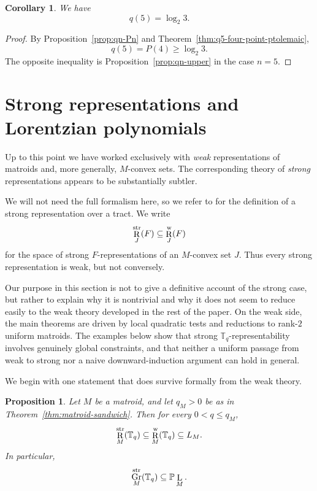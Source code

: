\documentclass[12pt]{amsart}
\newtheorem{proposition}[theorem]{Proposition}
\newtheorem{corollary}[theorem]{Corollary}
\theoremstyle{definition}
\newcommand{\1}{\mathbf{1}}
\DeclareMathOperator{\upL}{L}   %
\DeclareMathOperator{\upR}{R}   %
\DeclareMathOperator{\Gr}{Gr}
\renewcommand\P{{\mathbb P}}
\newcommand\T{{\mathbb T}}
\begin{document}
\begin{corollary}
\label{cor:q5-sharp}
We have
\[
        q(5)=\log_2 3.
\]
\end{corollary}

\begin{proof}
By Proposition~\ref{prop:qn-Pn} and Theorem~\ref{thm:q5-four-point-ptolemaic},
\[
        q(5)=P(4)\ge \log_2 3.
\]
The opposite inequality is Proposition~\ref{prop:qn-upper} in the case $n=5$.
\end{proof}


\section{Strong representations and Lorentzian polynomials}
\label{sec:strong-representations}

Up to this point we have worked exclusively with \emph{weak} representations of matroids
and, more generally, $M$-convex sets. The corresponding theory of \emph{strong}
representations appears to be substantially subtler.

We will not need the full formalism here, so we refer to \cite{BHKL0} for the definition of
a strong representation over a tract. We write
\[
\upR_J^{\rm str}(F)\subseteq \upR_J^{\rm w}(F)
\]
for the space of strong $F$-representations of an $M$-convex set $J$. Thus every
strong representation is weak, but not conversely.

Our purpose in this section is not to give a definitive account of the strong case, but
rather to explain why it is nontrivial and why it does not seem to reduce easily to the weak
theory developed in the rest of the paper. On the weak side, the main theorems are driven by
local quadratic tests and reductions to rank-$2$ uniform matroids. The examples below show
that strong $\T_q$-representability involves genuinely global constraints, and that neither
a uniform passage from weak to strong nor a naive downward-induction argument can hold in
general.

We begin with one statement that does survive formally from the weak theory.

\begin{proposition}
\label{prop:strong-lower-trivial}
Let $M$ be a matroid, and let $q_M>0$ be as in 
Theorem~\ref{thm:matroid-sandwich}. Then for every $0<q\le q_M$,
\[
\upR_M^{\rm str}(\T_q)\subseteq \upR_M^{\rm w}(\T_q)\subseteq L_M.
\]
In particular,
\[
\Gr_M^{\rm str}(\T_q)\subseteq \P\upL_M.
\]
\end{proposition}
\end{document}
